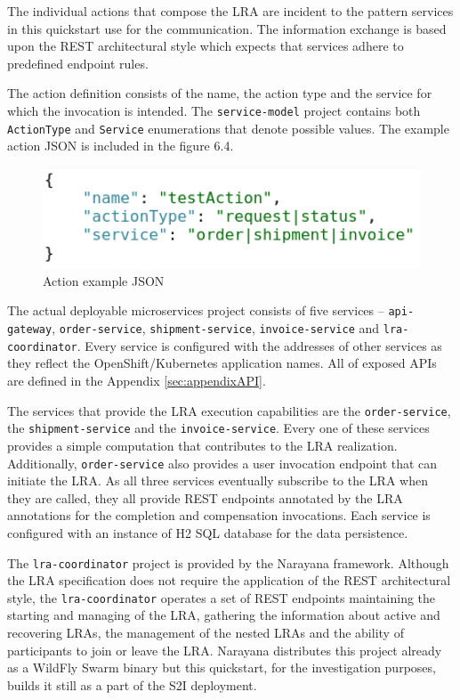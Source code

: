 \documentclass[oneside,
  digital, %
  table,   %
  nolof,     %
  nolot,     %
]{fithesis3}
\begin{document}
The individual actions that compose the LRA are incident to the pattern services in this quickstart use for the communication. The information exchange is based upon the REST architectural style which expects that services adhere to predefined endpoint rules. 

The action definition consists of the name, the action type and the service for which the invocation is intended. The \texttt{service-model} project contains both \texttt{ActionType} and \texttt{Service} enumerations that denote possible values. The example action JSON is included in the figure 6.4.

\begin{figure}
    \begin{center}
        \includegraphics[height=30mm]{images/actionJSON.png}
    \end{center}
    \caption{Action example JSON}
\end{figure}

The actual deployable microservices project consists of five services -- \texttt{api-gateway}, \texttt{order-service}, \texttt{shipment-service}, \texttt{invoice-service} and \texttt{lra-coordinator}. Every service is configured with the addresses of other services as they reflect the OpenShift/Kubernetes application names. All of exposed APIs are defined in the Appendix \ref{sec:appendixAPI}.

The services that provide the LRA execution capabilities are the \texttt{order-service}, the \texttt{shipment-service} and the \texttt{invoice-service}. Every one of these services provides a simple computation that contributes to the LRA realization. Additionally, \texttt{order-service} also provides a user invocation endpoint that can initiate the LRA. As all three services eventually subscribe to the LRA when they are called, they all provide REST endpoints annotated by the LRA annotations for the completion and compensation invocations. Each service is configured with an instance of H2 SQL database for the data persistence.

The \texttt{lra-coordinator} project is provided by the Narayana framework. Although the LRA specification does not require the application of the REST architectural style, the \texttt{lra-coordinator} operates a set of REST endpoints maintaining the starting and managing of the LRA, gathering the information about active and recovering LRAs, the management of the nested LRAs and the ability of participants to join or leave the LRA. Narayana distributes this project already as a WildFly Swarm binary but this quickstart, for the investigation purposes, builds it still as a part of the S2I deployment.
\end{document}
